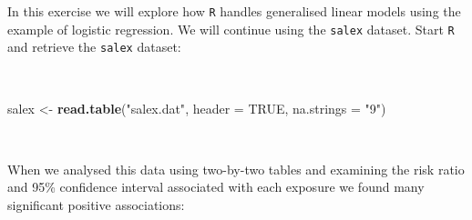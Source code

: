 \documentclass[12pt,a4paper]{book}
\newenvironment{Shaded}{\begin{snugshade}}{\end{snugshade}}
\newcommand{\DataTypeTok}[1]{\textcolor[rgb]{0.13,0.29,0.53}{#1}}
\newcommand{\KeywordTok}[1]{\textcolor[rgb]{0.13,0.29,0.53}{\textbf{#1}}}
\newcommand{\NormalTok}[1]{#1}
\newcommand{\OtherTok}[1]{\textcolor[rgb]{0.56,0.35,0.01}{#1}}
\newcommand{\StringTok}[1]{\textcolor[rgb]{0.31,0.60,0.02}{#1}}
\theoremstyle{definition}
\theoremstyle{definition}
\theoremstyle{definition}
\theoremstyle{remark}
\begin{document}
In this exercise we will explore how \texttt{R} handles generalised
linear models using the example of logistic regression. We will continue
using the \texttt{salex} dataset. Start \texttt{R} and retrieve the
\texttt{salex} dataset:

~

\begin{Shaded}
\begin{Highlighting}[]
\NormalTok{salex <-}\StringTok{ }\KeywordTok{read.table}\NormalTok{(}\StringTok{"salex.dat"}\NormalTok{, }\DataTypeTok{header =} \OtherTok{TRUE}\NormalTok{, }\DataTypeTok{na.strings =} \StringTok{"9"}\NormalTok{)}
\end{Highlighting}
\end{Shaded}

~

When we analysed this data using two-by-two tables and examining the
risk ratio and 95\% confidence interval associated with each exposure we
found many significant positive associations:

~
\end{document}
